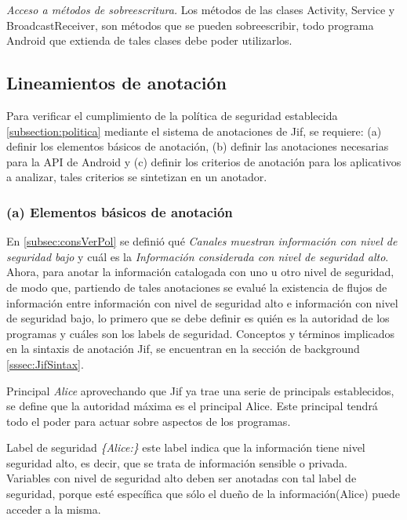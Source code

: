 \textit{Acceso a métodos de sobreescritura.}\newline
Los métodos de las clases Activity, Service y BroadcastReceiver, son métodos
que se pueden sobreescribir, todo programa Android que extienda de tales clases
debe poder utilizarlos.

\subsection{Lineamientos de anotación}
\label{subsec:linemientos}
Para verificar el cumplimiento de la política de seguridad
establecida \ref{subsection:politica} mediante el sistema de anotaciones de Jif,
se requiere: (a) definir los elementos básicos de anotación, (b) definir
las anotaciones necesarias para la API de Android y (c) definir los
criterios de anotación para los aplicativos a analizar, tales 
criterios se sintetizan en un anotador.

\subsubsection{(a) Elementos básicos de anotación}
En \ref{subsec:consVerPol} se definió qué \textit{Canales muestran
información con nivel de seguridad bajo} y cuál es la \textit{Información
considerada con nivel de seguridad alto}. Ahora, para anotar la información
catalogada con uno u otro nivel de seguridad, de modo que, partiendo de tales
anotaciones se evalué la existencia de flujos de información entre información
con nivel de seguridad alto e información con nivel de seguridad bajo, lo primero
que se debe definir es quién es la autoridad de los programas y cuáles son los
labels de seguridad.\newline
Conceptos y términos implicados en la sintaxis de anotación Jif, se
encuentran en la sección de background \ref{sssec:JifSintax}.

Principal \emph{Alice}\newline
aprovechando que Jif ya trae una serie de principals establecidos, se define que
la autoridad máxima es el principal Alice. Este principal tendrá todo el poder
para actuar sobre aspectos de los programas.

Label de seguridad \emph{\{Alice:\}}\newline
este label indica que la información tiene nivel seguridad alto, es decir, que
se trata de información sensible o privada.\\
Variables con nivel de seguridad alto deben ser anotadas con tal label de
seguridad, porque esté específica que sólo el dueño de la información(Alice)
puede acceder a la misma. 

